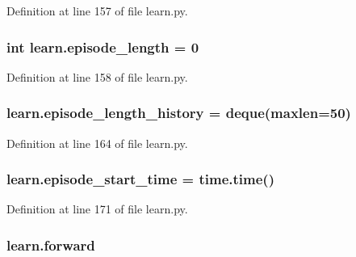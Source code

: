 Definition at line 157 of file learn.\+py.

\subsubsection[{\texorpdfstring{episode\+\_\+length}{episode_length}}]{\setlength{\rightskip}{0pt plus 5cm}int learn.\+episode\+\_\+length = 0}\hypertarget{namespacelearn_ae4490c7a6bca1f4587c5a4f662e1dcc8}{}\label{namespacelearn_ae4490c7a6bca1f4587c5a4f662e1dcc8}


Definition at line 158 of file learn.\+py.

\subsubsection[{\texorpdfstring{episode\+\_\+length\+\_\+history}{episode_length_history}}]{\setlength{\rightskip}{0pt plus 5cm}learn.\+episode\+\_\+length\+\_\+history = deque(maxlen=50)}\hypertarget{namespacelearn_ab297229048af5d469452446449da2c3f}{}\label{namespacelearn_ab297229048af5d469452446449da2c3f}


Definition at line 164 of file learn.\+py.

\subsubsection[{\texorpdfstring{episode\+\_\+start\+\_\+time}{episode_start_time}}]{\setlength{\rightskip}{0pt plus 5cm}learn.\+episode\+\_\+start\+\_\+time = time.\+time()}\hypertarget{namespacelearn_a501494c1d2211b6bda3c2670aa625a8b}{}\label{namespacelearn_a501494c1d2211b6bda3c2670aa625a8b}


Definition at line 171 of file learn.\+py.

\subsubsection[{\texorpdfstring{forward}{forward}}]{\setlength{\rightskip}{0pt plus 5cm}learn.\+forward}\hypertarget{namespacelearn_a33c110a8b5a4759b0b29bf9b97efa037}{}\label{namespacelearn_a33c110a8b5a4759b0b29bf9b97efa037}


